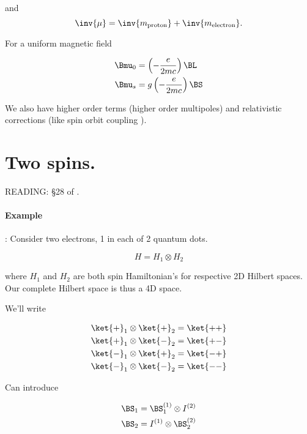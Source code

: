 and
\begin{equation}\label{eqn:qmTwoL16:150}
\inv{\mu} = \inv{m_\text{proton}} + \inv{m_\text{electron}}.
\end{equation}

For a uniform magnetic field

\begin{align}\label{eqn:qmTwoL16:170}
\Bmu_0 &= \left( -\frac{e}{2 m c} \right) \BL \\
\Bmu_s &= g \left( -\frac{e}{2 m c} \right) \BS
\end{align}

We also have higher order terms (higher order multipoles) and relativistic corrections (like spin orbit coupling \cite{wiki:spinorbit}).

\section{Two spins.}

READING: \S 28 of \cite{desai2009quantum}.

\paragraph{Example}: Consider two electrons, 1 in each of 2 quantum dots.

\begin{equation}\label{eqn:qmTwoL16:190}
H = H_{1} \otimes H_{2}
\end{equation}

where $H_1$ and $H_2$ are both spin Hamiltonian's for respective 2D Hilbert spaces.  Our complete Hilbert space is thus a 4D space.

We'll write

\begin{equation}\label{eqn:qmTwoL16:210}
\begin{aligned}
\ket{+}_1 \otimes \ket{+}_2 &= \ket{++} \\
\ket{+}_1 \otimes \ket{-}_2 &= \ket{+-} \\
\ket{-}_1 \otimes \ket{+}_2 &= \ket{-+} \\
\ket{-}_1 \otimes \ket{-}_2 &= \ket{--} 
\end{aligned}
\end{equation}

Can introduce

\begin{align}\label{eqn:qmTwoL16:230}
\BS_1 &= \BS_1^{(1)} \otimes I^{(2)} \\
\BS_2 &= I^{(1)} \otimes \BS_2^{(2)}
\end{align}


